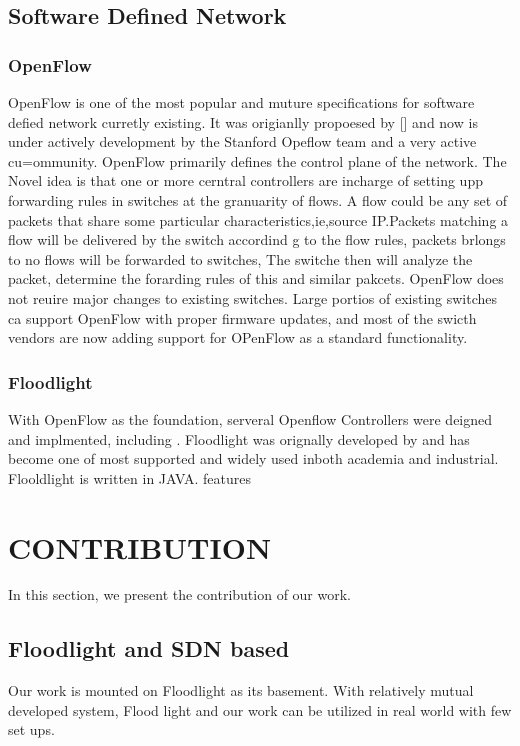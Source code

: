 \documentclass[a4paper,11pt,twocolumn]{article}
\begin{document}
\subsection{Software Defined Network}
\subsubsection{OpenFlow}
OpenFlow is one of the most popular and muture specifications for software defied network curretly existing. It was origianlly propoesed by [] and now is under actively development by the Stanford Opeflow team and a very active cu=ommunity.
OpenFlow primarily defines the control plane of the network. The Novel idea is that one or more cerntral controllers are incharge of setting upp forwarding rules in switches at the granuarity of flows. A flow could be any set of packets that share some particular characteristics,ie,source IP.Packets matching a  flow will be delivered by the switch accordind g to the flow rules, packets brlongs to no flows will be forwarded to switches, The switche then will analyze the packet, determine the forarding rules of this and similar pakcets.
OpenFlow does not reuire major changes to existing switches. Large portios of existing switches ca support OpenFlow with proper firmware updates, and most of the swicth vendors are now adding support for OPenFlow as a standard functionality.
\subsubsection{Floodlight}
With OpenFlow as the foundation, serveral Openflow Controllers were deigned and implmented, including . Floodlight was orignally developed by and has become one of most supported and widely used inboth academia and industrial. Flooldlight is written in JAVA. 
features



\section{CONTRIBUTION}
In this section, we present the contribution of our work.
\subsection{Floodlight and SDN based}
Our work is mounted on Floodlight as its basement. With relatively mutual developed system, Flood light and
our work can be utilized in real world with few set ups.
\end{document}
